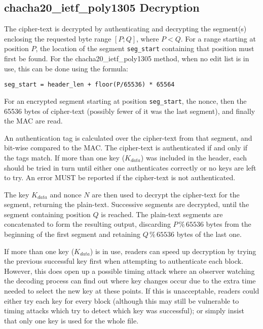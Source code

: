 \documentclass[10pt]{article}
\newcommand{\kw}[1]{\texttt{#1}}
\begin{document}
\subsection{chacha20\_ietf\_poly1305 Decryption}

The cipher-text is decrypted by authenticating and decrypting the segment(s) enclosing the requested byte range $[P;Q]$,
where $P<Q$.
For a range starting at position $P$, the location of the segment \kw{seg\_start} containing that position must
first be found.
For the chacha20\_ietf\_poly1305 method, when no edit list is in use, this can be done using the formula:

\begin{verbatim}
seg_start = header_len + floor(P/65536) * 65564
\end{verbatim}

For an encrypted segment starting at position \kw{seg\_start}, the nonce, then the 65536 bytes of cipher-text
(possibly fewer of it was the last segment), and finally the MAC are read.

An authentication tag is calculated over the cipher-text from that segment, and bit-wise compared to the MAC.
The cipher-text is authenticated if and only if the tags match.
If more than one key ($K_{data}$) was included in the header,
each should be tried in turn until either one authenticates correctly or no keys are left to try.
An error MUST be reported if the cipher-text is not authenticated.

The key $K_{data}$ and nonce $N$ are then used to decrypt the cipher-text for the segment, returning the plain-text.
Successive segments are decrypted, until the segment containing position $Q$ is reached.
The plain-text segments are concatenated to form the resulting output, discarding $P \mathbin{\%} 65536$ bytes from
the beginning of the first segment and retaining $Q \mathbin{\%} 65536$ bytes of the last one.

If more than one key ($K_{data}$) is in use,
readers can speed up decryption by trying the previous successful key first when attempting to authenticate each block.
However, this does open up a possible timing attack where an observer watching the decoding process can find
out where key changes occur due to the extra time needed to select the new key at these points.
If this is unacceptable, readers could either try each key for every block (although this may still be vulnerable
to timing attacks which try to detect which key was successful); or simply insist that only one key is used for
the whole file.
\end{document}
